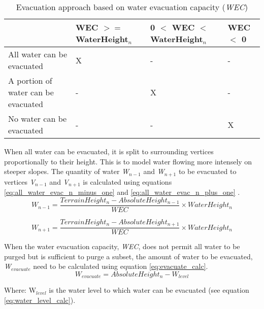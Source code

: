 \begin{table}[h]
  \centering
	    \begin{tabular}{|p{6cm}|p{3cm}|p{3cm}|p{3cm}|}
		\hline	
  	     &  WEC $>=$ WaterHeight$_{n}$ & 0 $<$ WEC $<$ WaterHeight$_{n}$ & WEC $<$ 0 \\
  	    \hline	
  	    All water can be evacuated & X & - & - \\
		\hline
  	    A portion of water can be evacuated & - & X & - \\
		\hline
  	    No water can be evacuated & - & - & X \\
		\hline
		\end{tabular}
		\caption{Evacuation approach based on water evacuation capacity (\textit{WEC})}
	  \label{tab:scenario_based_on_wec}
\end{table}

When all water can be evacuated, it is split to surrounding vertices proportionally to their height. This is to model water flowing more intensely on steeper slopes. The quantity of water \textit{W$_{n-1}$} and \textit{W$_{n+1}$} to be evacuated to vertices \textit{V$_{n-1}$} and \textit{V$_{n+1}$} is calculated using equations \ref{eq:all_water_evac_n_minus_one} and \ref{eq:all_water_evac_n_plus_one} . \\

\begin{equation}\label{eq:all_water_evac_n_minus_one}
W_{n-1} = \frac{TerrainHeight_{n} - AbsoluteHeight_{n-1}}{WEC} \times WaterHeight_{n}
\end{equation}

\begin{equation}\label{eq:all_water_evac_n_plus_one}
W_{n+1} = \frac{TerrainHeight_{n} - AbsoluteHeight_{n+1}}{WEC} \times WaterHeight_{n}
\end{equation}

When the water evacuation capacity, \textit{WEC}, does not permit all water to be purged but is sufficient to purge a subset, the amount of water to be evacuated, \textit{W$_{evacuate}$} need to be calculated using equation \ref{eq:evacuate_calc}. \\

\begin{equation}\label{eq:evacuate_calc}
	W_{evacuate} = AbsoluteHeight_{n} - W_{level}
\end{equation}

Where: W$_{level}$ is the water level to which water can be evacuated (see equation \ref{eq:water_level_calc}).

